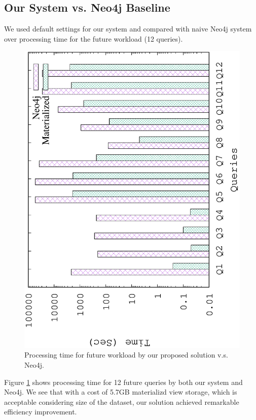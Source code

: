 \subsection{Our System vs. Neo4j Baseline}
We used default settings for our system and compared  with naive Neo4j system over processing time for the future workload (12 queries).


\begin{figure}[H]
	\centering
	\includegraphics[scale=0.5, angle=270]{plot/neo4j}
	\caption{Processing time for future workload by our proposed solution v.s. Neo4j.}
	\label{fig:neo4j}
\end{figure}

Figure \ref{fig:neo4j} shows processing time for 12 future queries by both our system and Neo4j. We see that with a cost of 5.7GB materializd view storage, which is acceptable considering size of the dataset, our solution achieved remarkable efficiency improvement.

